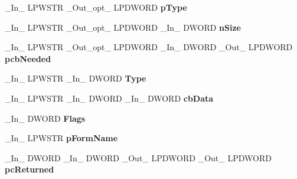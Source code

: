 \begin{DoxyCompactItemize}
\item 
\mbox{\label{struct___p_r_i_n_t_p_r_o_v_i_d_o_r_ad342383b32e32845462558fe3b7f9beb}} 
\+\_\+\+In\+\_\+ L\+P\+W\+S\+TR \+\_\+\+Out\+\_\+opt\+\_\+ L\+P\+D\+W\+O\+RD {\bfseries p\+Type}
\item 
\mbox{\label{struct___p_r_i_n_t_p_r_o_v_i_d_o_r_adfa862991587a0c3e337eb6435e1d1af}} 
\+\_\+\+In\+\_\+ L\+P\+W\+S\+TR \+\_\+\+Out\+\_\+opt\+\_\+ L\+P\+D\+W\+O\+RD \+\_\+\+In\+\_\+ D\+W\+O\+RD {\bfseries n\+Size}
\item 
\mbox{\label{struct___p_r_i_n_t_p_r_o_v_i_d_o_r_a9c14c13e29d65219885b0958506d495e}} 
\+\_\+\+In\+\_\+ L\+P\+W\+S\+TR \+\_\+\+Out\+\_\+opt\+\_\+ L\+P\+D\+W\+O\+RD \+\_\+\+In\+\_\+ D\+W\+O\+RD \+\_\+\+Out\+\_\+ L\+P\+D\+W\+O\+RD {\bfseries pcb\+Needed}
\item 
\mbox{\label{struct___p_r_i_n_t_p_r_o_v_i_d_o_r_ae4ac59f0fb2a7284e9f1ff9cf1f36417}} 
\+\_\+\+In\+\_\+ L\+P\+W\+S\+TR \+\_\+\+In\+\_\+ D\+W\+O\+RD {\bfseries Type}
\item 
\mbox{\label{struct___p_r_i_n_t_p_r_o_v_i_d_o_r_a5e4a3f4aa55b367241e9bd0828839d29}} 
\+\_\+\+In\+\_\+ L\+P\+W\+S\+TR \+\_\+\+In\+\_\+ D\+W\+O\+RD \+\_\+\+In\+\_\+ D\+W\+O\+RD {\bfseries cb\+Data}
\item 
\mbox{\label{struct___p_r_i_n_t_p_r_o_v_i_d_o_r_acebfd5502930217400849a9410f2fcba}} 
\+\_\+\+In\+\_\+ D\+W\+O\+RD {\bfseries Flags}
\item 
\mbox{\label{struct___p_r_i_n_t_p_r_o_v_i_d_o_r_a29c970c1ecdfb7e0d8c9bbfc8b9957c3}} 
\+\_\+\+In\+\_\+ L\+P\+W\+S\+TR {\bfseries p\+Form\+Name}
\item 
\mbox{\label{struct___p_r_i_n_t_p_r_o_v_i_d_o_r_a6d5f74d1ad50edc25d7c317b79dbc493}} 
\+\_\+\+In\+\_\+ D\+W\+O\+RD \+\_\+\+In\+\_\+ D\+W\+O\+RD \+\_\+\+Out\+\_\+ L\+P\+D\+W\+O\+RD \+\_\+\+Out\+\_\+ L\+P\+D\+W\+O\+RD {\bfseries pc\+Returned}
\item 
\mbox{\label{struct___p_r_i_n_t_p_r_o_v_i_d_o_r_a8bf2fdfd40d1d1892241e26b1b0c726b}} 

\end{DoxyCompactItemize}
